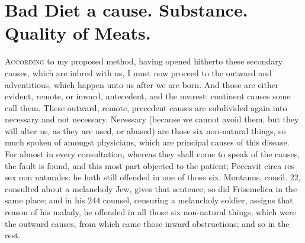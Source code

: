 {{\section[Bad Diet]{Bad Diet a cause. Substance. Quality of Meats.}

\lettrine{A}{ccording} to my proposed method, having opened hitherto these secondary
causes, which are inbred with us, I must now proceed to the outward and
adventitious, which happen unto us after we are born. And those are
either evident, remote, or inward, antecedent, and the nearest:
continent causes some call them. These outward, remote, precedent
causes are subdivided again into necessary and not necessary. Necessary
(because we cannot avoid them, but they will alter us, as they are
used, or abused) are those six non-natural things, so much spoken of
amongst physicians, which are principal causes of this disease. For
almost in every consultation, whereas they shall come to speak of the
causes, the fault is found, and this most part objected to the patient;
Peccavit circa res sex non naturales: he hath still offended in one of
those six. Montanus, consil. 22, consulted about a melancholy Jew,
gives that sentence, so did Frisemelica in the same place; and in his
244 counsel, censuring a melancholy soldier, assigns that reason of his
malady, he offended in all those six non-natural things, which
were the outward causes, from which came those inward obstructions; and
so in the rest.

}}
